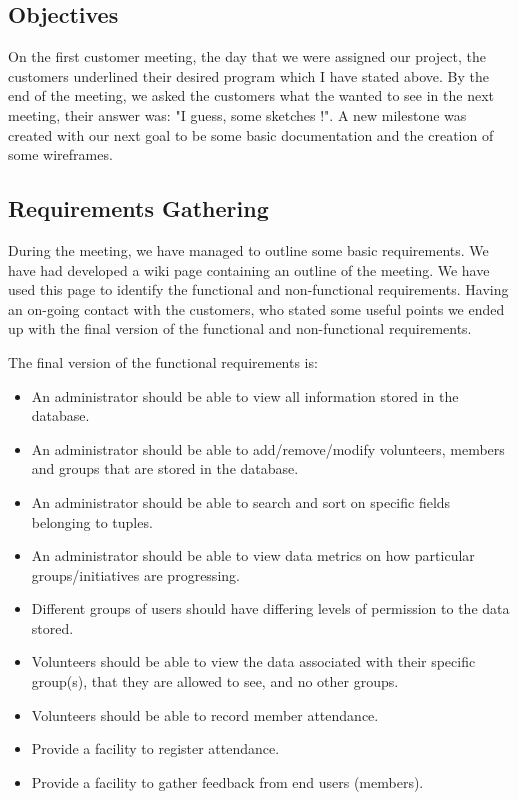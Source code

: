 \documentclass{l3proj}
\begin{document}
\subsection{Objectives}
\label{objectives} 

On the first customer meeting, the day that we were assigned our project, the customers underlined their desired program which I have stated above. By the end of the meeting, we asked the customers what the wanted to see in the next meeting, their answer was: "I guess, some sketches !". A new milestone was created with our next goal to be some basic documentation and the creation of some wireframes.

\subsection{Requirements Gathering}
\label{requirements}

During the meeting, we have managed to outline some basic requirements. We have had developed a wiki page containing an outline of the meeting. We have used this page to identify the functional and non-functional requirements. Having an on-going contact with the customers, who stated some useful points we ended up with the final version of the functional and non-functional requirements. 

The final version of the functional requirements is:
\begin{itemize}

\item An administrator should be able to view all information stored in the database.

\item An administrator should be able to add/remove/modify volunteers, members and groups that are stored in the database.

\item An administrator should be able to search and sort on specific fields belonging to tuples.

\item An administrator should be able to view data metrics on how particular groups/initiatives are progressing.

\item Different groups of users should have differing levels of permission to the data stored.

\item Volunteers should be able to view the data associated with their specific group(s), that they are allowed to see, and no other groups.

\item Volunteers should be able to record member attendance.

\item Provide a facility to register attendance.

\item Provide a facility to gather feedback from end users (members).

\end{itemize}
\end{document}
